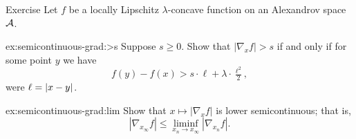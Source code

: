 \begin{thm}{Exercise}\label{ex:semicontinuous-grad}
Let $f$ be a locally Lipschitz $\lambda$-concave function on an Alexandrov space $\mathcal{A}$.

\begin{subthm}{ex:semicontinuous-grad:>s}
Suppose $s\ge 0$.
Show that $|\nabla_xf|> s$ if and only if for some point $y$ we have
\[f(y)-f(x)>s\cdot \ell+\lambda\cdot \tfrac{\ell^2}2,\]
were $\ell=|{x}-{y}|_{}^{{}}$.
\end{subthm}

\begin{subthm}{ex:semicontinuous-grad:lim} Show that $x\mapsto|\nabla_xf|$ is lower semicontinuous;
that is,
\[|\nabla_{x_\infty}f|\le \liminf_{x_n\to x_\infty} |\nabla_{x_n}f|.\]

\end{subthm}

\end{thm}
